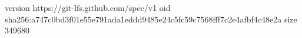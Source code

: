 version https://git-lfs.github.com/spec/v1
oid sha256:a747c0bd3f01e55e791ada1eddd9485e24c5fc59c7568fff7c2e4afbf4c48e2a
size 349680
